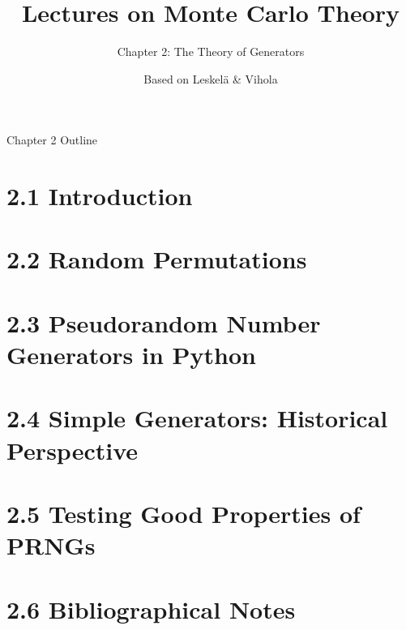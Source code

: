 \documentclass[aspectratio=169,10pt]{beamer}
\title[MC Theory -- Ch.2]{Lectures on Monte Carlo Theory}
\subtitle{Chapter 2: The Theory of Generators}
\author{Based on Leskel\"{a} \& Vihola}
\date{}
\begin{document}
\begin{frame}
  \titlepage
\end{frame}

\begin{frame}{Chapter 2 Outline}
  \tableofcontents
\end{frame}

\section{2.1 Introduction}
\section{2.2 Random Permutations}
\section{2.3 Pseudorandom Number Generators in Python}
\section{2.4 Simple Generators: Historical Perspective}
\section{2.5 Testing Good Properties of PRNGs}
\section{2.6 Bibliographical Notes}
\end{document}
